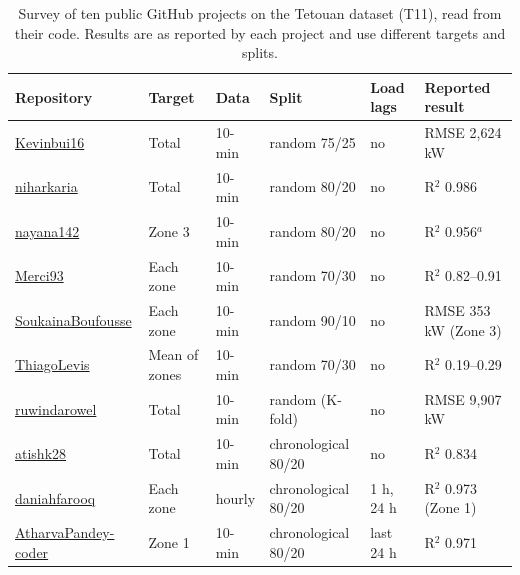 \begin{table}[H]\centering\small
\caption{Survey of ten public GitHub projects on the Tetouan dataset (T11), read from their code. Results are as reported by each project and use different targets and splits.}\label{tab:survey}
\setlength{\tabcolsep}{4pt}
\begin{tabular}{@{}llllll@{}}
\toprule
Repository & Target & Data & Split & Load lags & Reported result \\
\midrule
\href{https://github.com/Kevinbui16/Electricity-Consumption-Prediction}{Kevinbui16} & Total & 10-min & random 75/25 & no & RMSE 2,624 kW \\
\href{https://github.com/niharkaria/Tetouan_Power_Consumption_Analysis}{niharkaria} & Total & 10-min & random 80/20 & no & R$^2$ 0.986 \\
\href{https://github.com/nayana142/Power-Consumption-of-Tetouan-City}{nayana142} & Zone 3 & 10-min & random 80/20 & no & R$^2$ 0.956$^a$ \\
\href{https://github.com/Merci93/Electric-Power-Consumption}{Merci93} & Each zone & 10-min & random 70/30 & no & R$^2$ 0.82--0.91 \\
\href{https://github.com/SoukainaBoufousse/ML_predict-the-power-consumption-in-10-minute-windows-of-Tetouan-city}{SoukainaBoufousse} & Each zone & 10-min & random 90/10 & no & RMSE 353 kW (Zone 3) \\
\href{https://github.com/ThiagoLevis/Power-consumption-of-Tetouan}{ThiagoLevis} & Mean of zones & 10-min & random 70/30 & no & R$^2$ 0.19--0.29 \\
\href{https://github.com/ruwindarowel/Tetouan-City-Power-Consumption}{ruwindarowel} & Total & 10-min & random (K-fold) & no & RMSE 9,907 kW \\
\href{https://github.com/atishk28/electricity-load-forecasting}{atishk28} & Total & 10-min & chronological 80/20 & no & R$^2$ 0.834 \\
\href{https://github.com/daniahfarooq/electricity-demand-forecasting}{daniahfarooq} & Each zone & hourly & chronological 80/20 & 1 h, 24 h & R$^2$ 0.973 (Zone 1) \\
\href{https://github.com/AtharvaPandey-coder/Power-Consumption}{AtharvaPandey-coder} & Zone 1 & 10-min & chronological 80/20 & last 24 h & R$^2$ 0.971 \\
\bottomrule\end{tabular}
\par{}
\end{table}
